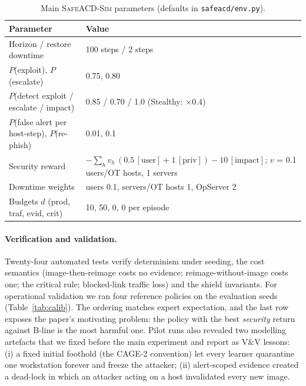 \documentclass[10pt]{article}
\newcommand{\safeacd}{\textsc{SafeACD-Sim}}
\begin{document}
\begin{table}[t]
\centering
\caption{Main \safeacd{} parameters (defaults in \texttt{safeacd/env.py}).}
\label{tab:params}
\small
\begin{tabular}{ll}
\toprule
Parameter & Value \\
\midrule
Horizon / restore downtime & 100 steps / 2 steps \\
$P$(exploit), $P$(escalate) & 0.75, 0.80 \\
$P$(detect exploit / escalate / impact) & 0.85 / 0.70 / 1.0 (Stealthy: $\times 0.4$) \\
$P$(false alert per host-step), $P$(re-phish) & 0.01, 0.1 \\
Security reward & $-\sum_h v_h\,(0.5\,[\text{user}]+1\,[\text{priv}])-10\,[\text{impact}]$; $v$ = 0.1 users/OT hosts, 1 servers \\
Downtime weights & users 0.1, servers/OT hosts 1, OpServer 2 \\
Budgets $d$ (prod, traf, evid, crit) & 10, 50, 0, 0 per episode \\
\bottomrule
\end{tabular}
\end{table}

\paragraph{Verification and validation.}
Twenty-four automated tests verify determinism under seeding, the cost semantics
(image-then-reimage costs no evidence; reimage-without-image costs one; the
critical rule; blocked-link traffic loss) and the shield invariants. For
operational validation we ran four reference policies on the evaluation seeds
(Table~\ref{tab:calib}). The ordering matches expert expectation, and the last
row exposes the paper's motivating problem: the policy with the best
\emph{security} return against B-line is the most harmful one. Pilot runs
also revealed two modelling artefacts that we fixed before the main
experiment and report as V\&V lessons: (i) a fixed initial foothold (the
CAGE-2 convention) let every learner quarantine one workstation forever and
freeze the attacker; (ii) alert-scoped evidence created a dead-lock in which
an attacker acting on a host invalidated every new image.
\end{document}
